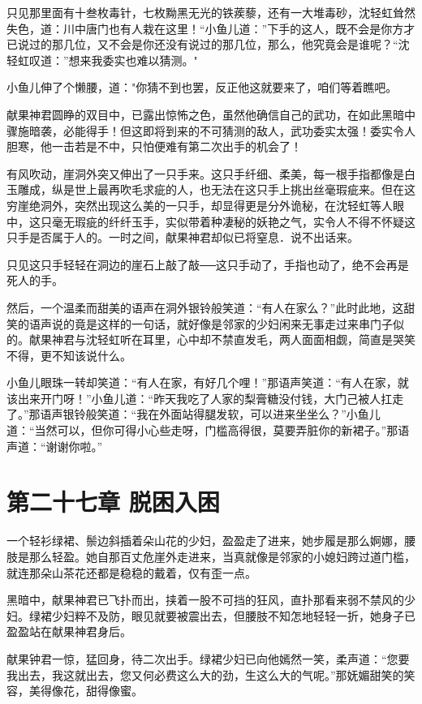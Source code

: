 \documentclass[12pt,oneside]{book}
\begin{document}
只见那里面有十叁枚毒针，七枚黝黑无光的铁蒺藜，还有一大堆毒砂，沈轻虹耸然失色，道：川中唐门也有人栽在这里！``小鱼儿道：''下手的这人，既不会是你方才已说过的那几位，又不会是你还没有说过的那几位，那么，他究竟会是谁呢？``沈轻虹叹道：''想来我委实也难以猜测。"

小鱼儿伸了个懒腰，道："你猜不到也罢，反正他这就要来了，咱们等着瞧吧。

献果神君圆睁的双目中，已露出惊怖之色，虽然他确信自己的武功，在如此黑暗中骤施暗袭，必能得手！但这即将到来的不可猜测的敌人，武功委实太强！委实令人胆寒，他一击若是不中，只怕便难有第二次出手的机会了！

有风吹动，崖洞外突又伸出了一只手来。这只手纤细、柔美，每一根手指都像是白玉雕成，纵是世上最再吹毛求疵的人，也无法在这只手上挑出丝毫瑕疵来。但在这穷崖绝洞外，突然出现这么美的一只手，却显得更是分外诡秘，在沈轻虹等人眼中，这只毫无瑕疵的纤纤玉手，实似带着种凄秘的妖艳之气，实令人不得不怀疑这只手是否属于人的。一时之间，献果神君却似已将窒息．说不出话来。

只见这只手轻轻在洞边的崖石上敲了敲──这只手动了，手指也动了，绝不会再是死人的手。

然后，一个温柔而甜美的语声在洞外银铃般笑道：``有人在家么？''此时此地，这甜笑的语声说的竟是这样的一句话，就好像是邻家的少妇闲来无事走过来串门子似的。献果神君与沈轻虹听在耳里，心中却不禁直发毛，两人面面相觑，简直是哭笑不得，更不知该说什么。

小鱼儿眼珠一转却笑道：``有人在家，有好几个哩！''那语声笑道：``有人在家，就该出来开门呀！''小鱼儿道：``昨天我吃了人家的梨膏糖没付钱，大门己被人扛走了。''那语声银铃般笑道：``我在外面站得腿发软，可以进来坐坐么？''小鱼儿道：``当然可以，但你可得小心些走呀，门槛高得很，莫要弄脏你的新裙子。''那语声道：``谢谢你啦。''

\hypertarget{ux7b2cux4e8cux5341ux4e03ux7ae0-ux8131ux56f0ux5165ux56f0}{%
\chapter{第二十七章
脱困入困}\label{ux7b2cux4e8cux5341ux4e03ux7ae0-ux8131ux56f0ux5165ux56f0}}

一个轻衫绿裙、鬃边斜插着朵山花的少妇，盈盈走了进来，她步履是那么婀娜，腰肢是那么轻盈。她自那百丈危崖外走进来，当真就像是邻家的小媳妇跨过道门槛，就连那朵山茶花还都是稳稳的戴着，仅有歪一点。

黑暗中，献果神君已飞扑而出，挟着一股不可挡的狂风，直扑那看来弱不禁风的少妇。绿裙少妇粹不及防，眼见就要被震出去，但腰肢不知怎地轻轻一折，她身子已盈盈站在献果神君身后。

献果钟君一惊，猛回身，待二次出手。绿裙少妇已向他嫣然一笑，柔声道：``您要我出去，我这就出去，您又何必费这么大的劲，生这么大的气呢。''那妩媚甜笑的笑容，美得像花，甜得像蜜。
\end{document}
